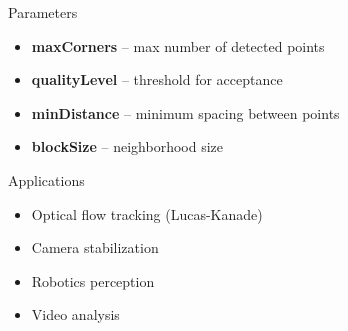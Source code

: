 \documentclass{beamer}
\begin{document}
\begin{frame}{Parameters}
    \begin{itemize}
        \item \textbf{maxCorners} – max number of detected points
        \item \textbf{qualityLevel} – threshold for acceptance
        \item \textbf{minDistance} – minimum spacing between points
        \item \textbf{blockSize} – neighborhood size
    \end{itemize}
\end{frame}

\begin{frame}{Applications}
    \begin{itemize}
        \item Optical flow tracking (Lucas-Kanade)
        \item Camera stabilization
        \item Robotics perception
        \item Video analysis
    \end{itemize}
\end{frame}
\end{document}

